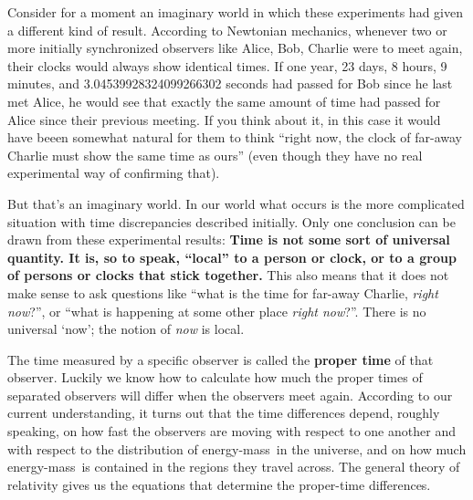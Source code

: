\documentclass[a4paper,12pt,%
onecolumn,oneside,%
british%
]{memoir}
\renewcommand*{\|}[1][]{\nonscript\:#1\vert\nonscript\:\mathopen{}}
\newcommand*{\energym}{energy-mass}
\begin{document}
\medskip

Consider for a moment an imaginary world in which these experiments had given a different kind of result. According to Newtonian mechanics, whenever two or more initially synchronized observers like Alice, Bob, Charlie were to meet again, their clocks would always show identical times. If one year, 23 days, 8 hours, 9 minutes, and \num{3.04539928324099266302} seconds had passed for Bob since he last met Alice, he would see that exactly the same amount of time had passed for Alice since their previous meeting. If you think about it, in this case it would have beeen somewhat natural for them to think \enquote{right now, the clock of far-away Charlie must show the same time as ours} (even though they have no real experimental way of confirming that).

But that's an imaginary world. In our world what occurs is the more complicated situation with time discrepancies described initially. Only one conclusion can be drawn from these experimental results: \textbf{Time is not some sort of universal quantity. It is, so to speak, \enquote{local} to a person or clock, or to a group of persons or clocks that stick together.} This also means that it does not make sense to ask questions like \enquote{what is the time for far-away Charlie, \emph{right now}?}, or \enquote{what is happening at some other place \emph{right now}?}. There is no universal \enquote*{now}; the notion of \emph{now} is local.


The time measured by a specific observer is called the \textbf{proper time} of that observer. Luckily we know how to calculate how much the proper times of separated observers will differ when the observers meet again. According to our current understanding, it turns out that the time differences depend, roughly speaking, on how fast the observers are moving with respect to one another and with respect to the distribution of \energym\ in the universe, and on how much \energym\ is contained in the regions they travel across. The general theory of relativity gives us the equations that determine the proper-time differences.
\end{document}
